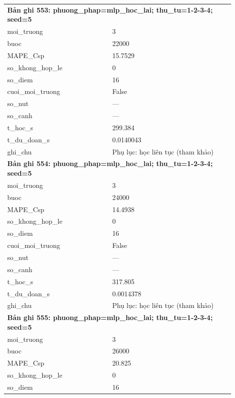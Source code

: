 \begin{longtable}{p{0.43\linewidth}p{0.50\linewidth}}
\midrule
\multicolumn{2}{p{0.95\linewidth}}{\textbf{Bản ghi 553: phuong\_phap=mlp\_hoc\_lai; thu\_tu=1-2-3-4; seed=5}} \\
moi\_\allowbreak truong & 3 \\
buoc & 22000 \\
MAPE\_\allowbreak Csp & 15.7529 \\
so\_\allowbreak khong\_\allowbreak hop\_\allowbreak le & 0 \\
so\_\allowbreak diem & 16 \\
cuoi\_\allowbreak moi\_\allowbreak truong & False \\
so\_\allowbreak nut & — \\
so\_\allowbreak canh & — \\
t\_\allowbreak hoc\_\allowbreak s & 299.384 \\
t\_\allowbreak du\_\allowbreak doan\_\allowbreak s & 0.0140043 \\
ghi\_\allowbreak chu & Phụ lục: học liên tục (tham khảo) \\
\midrule
\multicolumn{2}{p{0.95\linewidth}}{\textbf{Bản ghi 554: phuong\_phap=mlp\_hoc\_lai; thu\_tu=1-2-3-4; seed=5}} \\
moi\_\allowbreak truong & 3 \\
buoc & 24000 \\
MAPE\_\allowbreak Csp & 14.4938 \\
so\_\allowbreak khong\_\allowbreak hop\_\allowbreak le & 0 \\
so\_\allowbreak diem & 16 \\
cuoi\_\allowbreak moi\_\allowbreak truong & False \\
so\_\allowbreak nut & — \\
so\_\allowbreak canh & — \\
t\_\allowbreak hoc\_\allowbreak s & 317.805 \\
t\_\allowbreak du\_\allowbreak doan\_\allowbreak s & 0.0014378 \\
ghi\_\allowbreak chu & Phụ lục: học liên tục (tham khảo) \\
\midrule
\multicolumn{2}{p{0.95\linewidth}}{\textbf{Bản ghi 555: phuong\_phap=mlp\_hoc\_lai; thu\_tu=1-2-3-4; seed=5}} \\
moi\_\allowbreak truong & 3 \\
buoc & 26000 \\
MAPE\_\allowbreak Csp & 20.825 \\
so\_\allowbreak khong\_\allowbreak hop\_\allowbreak le & 0 \\
so\_\allowbreak diem & 16 \\

\end{longtable}
